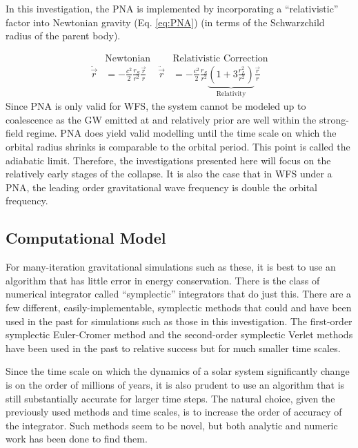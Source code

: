 \documentclass{report}
\begin{document}
                In this investigation, the PNA is implemented by incorporating a ``relativistic'' factor into Newtonian gravity (Eq. \ref{eq:PNA}) (in terms of the Schwarzchild radius of the parent body)\cite{Mercury_Euler}.

                \begin{align} \label{eq:PNA}
                    &\text{Newtonian} & &\text{Relativistic Correction} \nonumber \\
                    \ddot{\vec{r}} &= - \frac{c^2}{2} \frac{r_S}{r^2} \frac{\Vec{r}}{r} & \ddot{\vec{r}} &= - \frac{c^2}{2} \frac{r_S}{r^2} \underbrace{\left( 1 + 3 \frac{r_L^2}{r^2} \right)}_\text{Relativity} \frac{\Vec{r}}{r}
                \end{align}
                Since PNA is only valid for WFS, the system cannot be modeled up to coalescence as the GW emitted at and relatively prior are well within the strong-field regime.  PNA does yield valid modelling until the time scale on which the orbital radius shrinks is comparable to the orbital period.  This point is called the adiabatic limit\cite{BaumgarteShapiro2021}.  Therefore, the investigations presented here will focus on the relatively early stages of the collapse.
                It is also the case that in WFS under a PNA, the leading order gravitational wave frequency is double the orbital frequency\cite{BaumgarteShapiro2021}.

        \subsection{Computational Model}

            For many-iteration gravitational simulations such as these, it is best to use an algorithm that has little error in energy conservation.  There is the class of numerical integrator called ``symplectic'' integrators that do just this.  There are a few different, easily-implementable, symplectic methods that could and have been used in the past for simulations such as those in this investigation. The first-order symplectic Euler-Cromer\cite{Mercury_Euler} method and the second-order symplectic Verlet\cite{Chapman_2019} methods have been used in the past to relative success but for much smaller time scales.

            Since the time scale on which the dynamics of a solar system significantly change is on the order of millions of years, it is also prudent to use an algorithm that is still substantially accurate for larger time steps.  The natural choice, given the previously used methods and time scales, is to increase the order of accuracy of the integrator.  Such methods seem to be novel, but both analytic and numeric work has been done to find them\cite{YOSHIDA1990262}.
\end{document}
